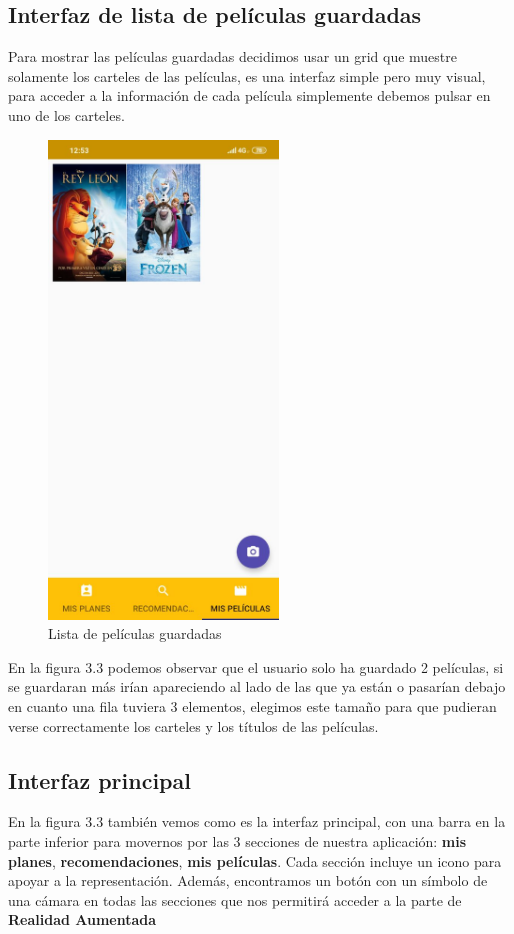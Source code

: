 \subsection{Interfaz de lista de películas guardadas}
\label{makereference3.4.2}
Para mostrar las películas guardadas decidimos usar un grid que muestre solamente los carteles de las películas, es una interfaz simple pero muy visual, para acceder a la información
de cada película simplemente debemos pulsar en uno de los carteles.
\begin{figure}[H]
    \centering
    \includegraphics[height=5in]{figures/FilmsList.jpg}
    \caption{Lista de películas guardadas}
\end{figure}
En la figura 3.3 podemos observar que el usuario solo ha guardado 2 películas, si se guardaran más irían apareciendo al lado de las que ya están o pasarían debajo en cuanto una 
fila tuviera 3 elementos, elegimos este tamaño para que pudieran verse correctamente los carteles y los títulos de las películas.
\subsection{Interfaz principal}
\label{makereference3.4.3}
En la figura 3.3 también vemos como es la interfaz principal, con una barra en la parte inferior para movernos por las 3 secciones de nuestra aplicación: \textbf{mis planes}, \textbf{recomendaciones}, \textbf{mis películas}.
Cada sección incluye un icono para apoyar a la representación.
Además, encontramos un botón con un símbolo de una cámara en todas las secciones que nos permitirá acceder a la parte de \textbf{Realidad Aumentada}

